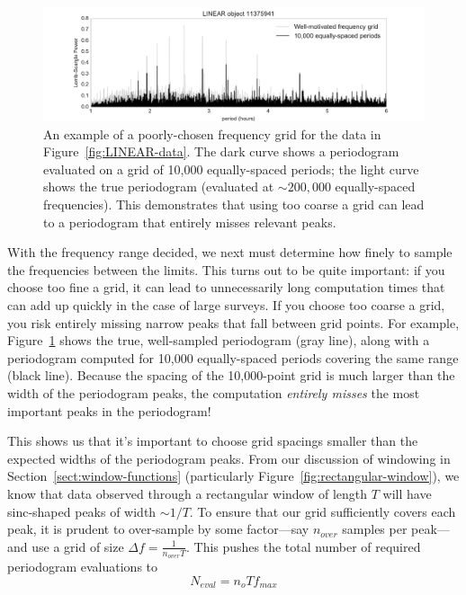 \documentclass[preprint]{aastex}
\newcommand{\fig}[1]{Figure~\ref{fig:#1}}
\newcommand{\figlabel}[1]{\label{fig:#1}}
\newcommand{\eqlabel}[1]{\label{eq:#1}}
\newcommand{\Sect}[1]{Section~\ref{sect:#1}}
\newcommand{\sect}[1]{\Sect{#1}}
\begin{document}
\begin{figure}[ht]
  \centering
  \includegraphics[width=\textwidth]{fig19_LINEAR_coarse_grid}
  \caption{An example of a poorly-chosen frequency grid for the data in
    \fig{LINEAR-data}. The dark curve shows a periodogram evaluated on a
    grid of 10,000 equally-spaced periods; the light curve shows the true
    periodogram (evaluated at ${\sim}200,000$ equally-spaced frequencies).
    This demonstrates that using too coarse a grid can lead to a periodogram
    that entirely misses relevant peaks.
    \figlabel{LINEAR-coarse-grid}}
\end{figure}

With the frequency range decided, we next must determine how finely to sample
the frequencies between the limits.
This turns out to be quite important: if you choose too fine a grid, it can
lead to unnecessarily long computation times that can add up quickly in the
case of large surveys. If you choose too coarse a grid, you
risk entirely missing narrow peaks that fall between grid points.
For example, \fig{LINEAR-coarse-grid} shows the true, well-sampled periodogram
(gray line), along with a periodogram computed for 10,000 equally-spaced
periods covering the same range (black line).
Because the spacing of the 10,000-point grid is much larger than the width of
the periodogram peaks, the computation {\it entirely misses} the most
important peaks in the periodogram!

This shows us that it's important to choose grid spacings smaller than the
expected widths of the periodogram peaks.
From our discussion of windowing in \sect{window-functions}
(particularly \fig{rectangular-window}), we know that data observed through a
rectangular window of length $T$ will have sinc-shaped peaks of width
${\sim}1/T$.
To ensure that our grid sufficiently covers each peak, it is prudent to
over-sample by some factor---say $n_{over}$ samples per peak---and
use a grid of size $\Delta f = \frac{1}{n_{over} T}$.
This pushes the total number of required periodogram evaluations to
\begin{equation}
  \eqlabel{n-eval}
  N_{eval} = n_o T f_{max}
\end{equation}
\end{document}
